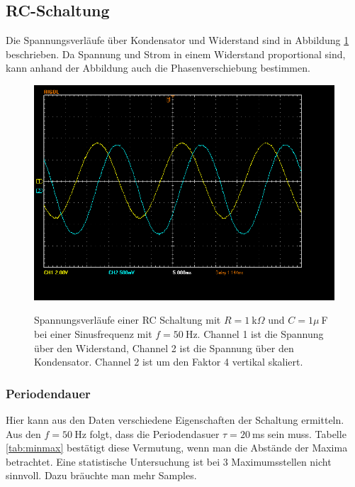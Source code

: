 \documentclass{article}
\begin{document}
\subsection{RC-Schaltung}

Die Spannungsverläufe über Kondensator und Widerstand sind in Abbildung \ref{fig:schaltung1_sinus} beschrieben. Da Spannung und Strom in einem Widerstand proportional sind, kann anhand der Abbildung auch die Phasenverschiebung bestimmen.


\begin{figure}[H]
\caption{Spannungsverläufe einer RC Schaltung mit $R=1~$k$\Omega$ und $C=1\mu~$F bei einer Sinusfrequenz mit $f=50~$Hz. Channel 1 ist die Spannung über den Widerstand, Channel 2 ist die Spannung über den Kondensator. Channel 2 ist um den Faktor 4 vertikal skaliert.}
\label{fig:schaltung1_sinus}
{\centering
\includegraphics[scale=0.4]{winkler/Schaltung_1_Sinus.png}}
\end{figure}




\subsubsection{Periodendauer}
Hier kann aus den Daten verschiedene Eigenschaften der Schaltung ermitteln. Aus den $f=50~$Hz folgt, dass die Periodendasuer $\tau = 20~$ms sein muss. Tabelle \ref{tab:minmax} bestätigt diese Vermutung, wenn man die Abstände der Maxima betrachtet. Eine statistische Untersuchung ist bei 3 Maximumsstellen nicht sinnvoll. Dazu bräuchte man mehr Samples.
\end{document}
